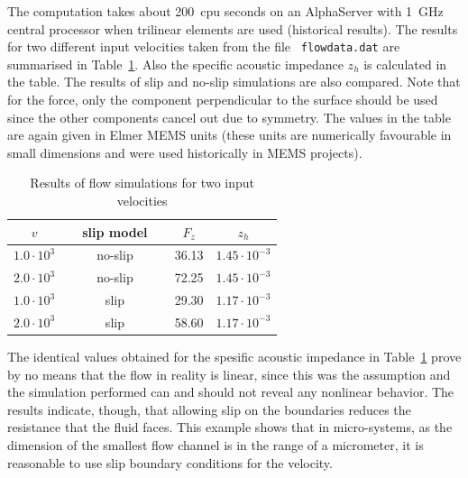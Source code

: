 The computation takes about 200~cpu seconds on an AlphaServer with
1~GHz central processor when trilinear elements are used (historical results).
The results
for two different input velocities taken from the file {\mbox{\tt
flowdata.dat}} are summarised in Table~\ref{tab:imped_res}. Also the
specific acoustic impedance $z_h$ is calculated in the table. The
results of slip and no-slip simulations are also compared.  Note that
for the force, only the component perpendicular to the surface should
be used since the other components cancel out due to symmetry. The
values in the table are again given in Elmer MEMS units (these units
are numerically favourable in small dimensions and were used historically
in MEMS projects).
\begin{table}[htb]
\caption{Results of flow simulations for two input velocities}
\label{tab:imped_res}
\begin{center}
\begin{tabular}{cccc} \hline
$v$ & \ \ slip model\ \  & $F_z$ & $z_h$ \\ \hline 
$1.0\cdot 10^3$   & no-slip  & 36.13  &  $1.45\cdot10^{-3}$ \\
$2.0\cdot 10^3$   & no-slip  & 72.25  &  $1.45\cdot10^{-3}$ \\ \hline
$1.0\cdot 10^3$   & slip     & 29.30  &  $1.17\cdot10^{-3}$ \\
$2.0\cdot 10^3$   & slip     & 58.60  &  $1.17\cdot10^{-3}$ \\ \hline
\end{tabular}
\end{center}
\end{table}

The identical values obtained for the spesific acoustic impedance in
Table~\ref{tab:imped_res} prove by no means that the flow in reality
is linear, since this was the assumption and the simulation performed
can and should not reveal any nonlinear behavior. The results
indicate, though, that allowing slip on the boundaries reduces the
resistance that the fluid faces. This example shows that in
micro-systems, as the dimension of the smallest flow channel is in the
range of a micrometer, it is reasonable to use slip boundary
conditions for the velocity.

